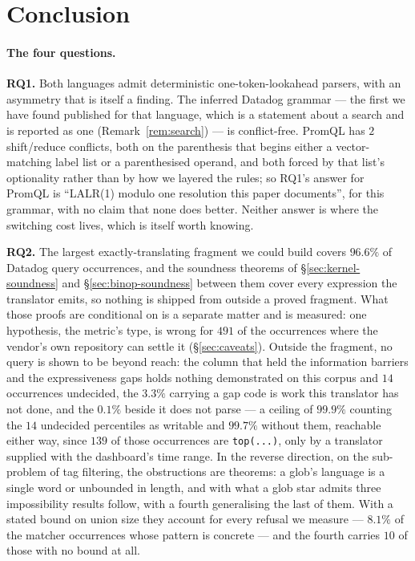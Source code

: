
\section{Conclusion}
\label{sec:conclusion}

\paragraph{The four questions.}
\textbf{RQ1.} Both languages admit deterministic one-token-lookahead parsers, with an
asymmetry that is itself a finding. The inferred Datadog grammar --- the first we have
found published for that language, which is a statement about a search and is reported
as one (Remark~\ref{rem:search}) --- is conflict-free. PromQL has $2$ shift/reduce conflicts,
both on the parenthesis that begins either a vector-matching label list or a parenthesised
operand, and both forced by that list's optionality rather than by how we layered the
rules; so RQ1's answer for PromQL is ``LALR(1) modulo one resolution this paper documents'', for
this grammar, with no claim that none does better. Neither answer is where the switching
cost lives, which is itself worth knowing.

\textbf{RQ2.} The largest exactly-translating fragment we could build covers $96.6\%$ of
Datadog query occurrences, and the soundness theorems of \S\ref{sec:kernel-soundness} and
\S\ref{sec:binop-soundness} between them cover every expression the translator emits, so
nothing is shipped from outside a proved fragment. What those proofs are conditional on
is a separate matter and is measured: one hypothesis, the metric's type, is wrong for
$491$ of the occurrences where the vendor's own repository can settle it
(\S\ref{sec:caveats}). Outside the fragment, no query is shown to be beyond reach: the
column that held the information barriers and the expressiveness gaps holds nothing
demonstrated on this corpus and $14$ occurrences undecided, the $3.3\%$ carrying a gap
code is work this translator has not done, and the
$0.1\%$ beside it does not parse --- a ceiling of $99.9\%$ counting the $14$ undecided
percentiles as writable and $99.7\%$ without them, reachable either way, since $139$ of
those occurrences are \texttt{top(...)}, only by a translator supplied with the
dashboard's time range. In the reverse direction, on the sub-problem of tag filtering, the
obstructions are theorems: a glob's language is a single word or unbounded in length,
and with what a glob star admits three impossibility results follow, with a fourth
generalising the last of them. With a stated bound on union size they account for
every refusal we measure --- $8.1\%$ of the matcher occurrences whose pattern is
concrete --- and the fourth carries $10$ of those with no bound at all.

